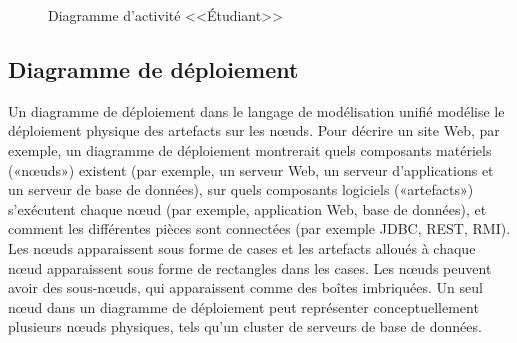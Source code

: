 \documentclass[12pt]{report}
\begin{document}
\begin{figure}[h]
\centering
    \centerline{}
    \caption{Diagramme d'activité <<Étudiant>>}
\end{figure}

\newpage

\subsection{Diagramme de déploiement}

Un diagramme de déploiement dans le langage de modélisation unifié modélise le déploiement physique des artefacts sur les nœuds. Pour décrire un site Web, par exemple, un diagramme de déploiement montrerait quels composants matériels («nœuds») existent (par exemple, un serveur Web, un serveur d’applications et un serveur de base de données), sur quels composants logiciels («artefacts») s’exécutent chaque nœud (par exemple, application Web, base de données), et comment les différentes pièces sont connectées (par exemple JDBC, REST, RMI).
\\
Les nœuds apparaissent sous forme de cases et les artefacts alloués à chaque nœud apparaissent sous forme de rectangles dans les cases. Les nœuds peuvent avoir des sous-nœuds, qui apparaissent comme des boîtes imbriquées. Un seul nœud dans un diagramme de déploiement peut représenter conceptuellement plusieurs nœuds physiques, tels qu'un cluster de serveurs de base de données.
\end{document}
